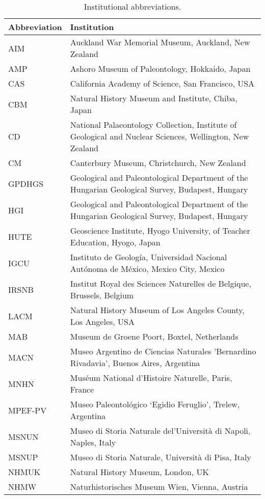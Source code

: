 \begin{longtable}{lp{}}

\caption{Institutional abbreviations.}\\

\hline
\textbf{Abbreviation} & \textbf{Institution}\\
\hline
AIM &
Auckland War Memorial Museum, Auckland, New Zealand\\
AMP &
Ashoro Museum of Paleontology, Hokkaido, Japan\\
CAS &
California Academy of Science, San Francisco, USA\\
CBM &
Natural History Museum and Institute, Chiba, Japan\\
CD &
National Palaeontology Collection, Institute of Geological and Nuclear Sciences, Wellington, New Zealand\\
CM &
Canterbury Museum, Christchurch, New Zealand\\
GPDHGS &
Geological and Paleontological Department of the Hungarian Geological Survey, Budapest, Hungary\\
HGI &
Geological and Paleontological Department of the Hungarian Geological Survey, Budapest, Hungary\\
HUTE &
Geoscience Institute, Hyogo University, of Teacher Education, Hyogo, Japan\\
IGCU &
Instituto de Geolog\'{i}a, Universidad Nacional Aut\'{o}noma de M\'{e}xico, Mexico City, Mexico\\
IRSNB &
Institut Royal des Sciences Naturelles de Belgique, Brussels, Belgium\\
LACM &
Natural History Museum of Los Angeles County, Los Angeles, USA\\
MAB &
Museum de Groene Poort, Boxtel, Netherlands\\
MACN &
Museo Argentino de Ciencias Naturales 'Bernardino Rivadavia', Buenos Aires, Argentina\\
MNHN &
Mus\'{e}um National d'Histoire Naturelle, Paris, France\\
MPEF-PV &
Museo Paleontol\'{o}gico `Egidio Feruglio', Trelew, Argentina\\
MSNUN &
Museo di Storia Naturale del'Universit\`{a} di Napoli, Naples, Italy\\
MSNUP &
Museo di Storia Naturale, Universit\`{a} di Pisa, Italy\\
NHMUK &
Natural History Museum, London, UK\\
NHMW &
Naturhistorisches Museum Wien, Vienna, Austria\\

\end{longtable}

